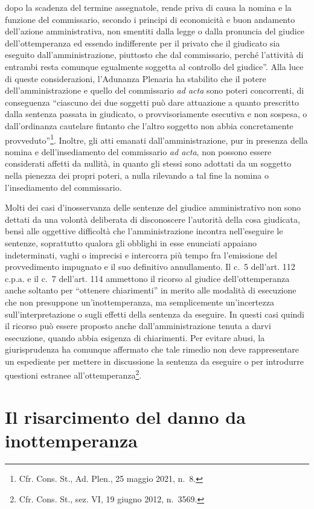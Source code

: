 \documentclass[12pt,it,a4paper,]{report}
\begin{document}
dopo la scadenza del termine assegnatole, rende priva di causa la nomina
e la funzione del commissario, secondo i principi di economicità e buon
andamento dell'azione amministrativa, non smentiti dalla legge o dalla
pronuncia del giudice dell'ottemperanza ed essendo indifferente per il
privato che il giudicato sia eseguito dall'amministrazione, piuttosto
che dal commissario, perché l'attività di entrambi resta comunque
egualmente soggetta al controllo del giudice''. Alla luce di queste
considerazioni, l'Adunanza Plenaria ha stabilito che il potere
dell'amministrazione e quello del commissario \emph{ad acta} sono poteri
concorrenti, di conseguenza ``ciascuno dei due soggetti può dare
attuazione a quanto prescritto dalla sentenza passata in giudicato, o
provvisoriamente esecutiva e non sospesa, o dall'ordinanza cautelare
fintanto che l'altro soggetto non abbia concretamente
provveduto''\footnote{Cfr. Cons. St., Ad. Plen., 25 maggio 2021, n.~8.}.
Inoltre, gli atti emanati dall'amministrazione, pur in presenza della
nomina e dell'insediamento del commissario \emph{ad acta}, non possono
essere considerati affetti da nullità, in quanto gli stessi sono
adottati da un soggetto nella pienezza dei propri poteri, a nulla
rilevando a tal fine la nomina o l'insediamento del commissario.

Molti dei casi d'inosservanza delle sentenze del giudice amministrativo
non sono dettati da una volontà deliberata di disconoscere l'autorità
della cosa giudicata, bensì alle oggettive difficoltà che
l'amministrazione incontra nell'eseguire le sentenze, soprattutto
qualora gli obblighi in esse enunciati appaiano indeterminati, vaghi o
imprecisi e intercorra più tempo fra l'emissione del provvedimento
impugnato e il suo definitivo annullamento. Il c.~5 dell'art. 112 c.p.a.
e il c.~7 dell'art. 114 ammettono il ricorso al giudice
dell'ottemperanza anche soltanto per ``ottenere chiarimenti'' in merito
alle modalità di esecuzione che non presuppone un'inottemperanza, ma
semplicemente un'incertezza sull'interpretazione o sugli effetti della
sentenza da eseguire. In questi casi quindi il ricorso può essere
proposto anche dall'amministrazione tenuta a darvi esecuzione, quando
abbia esigenza di chiarimenti. Per evitare abusi, la giurisprudenza ha
comunque affermato che tale rimedio non deve rappresentare un espediente
per mettere in discussione la sentenza da eseguire o per introdurre
questioni estranee all'ottemperanza\footnote{Cfr. Cons. St., sez. VI, 19
  giugno 2012, n.~3569.}.

\hypertarget{il-risarcimento-del-danno-da-inottemperanza}{%
\section{Il risarcimento del danno da
inottemperanza}\label{il-risarcimento-del-danno-da-inottemperanza}}
\end{document}
